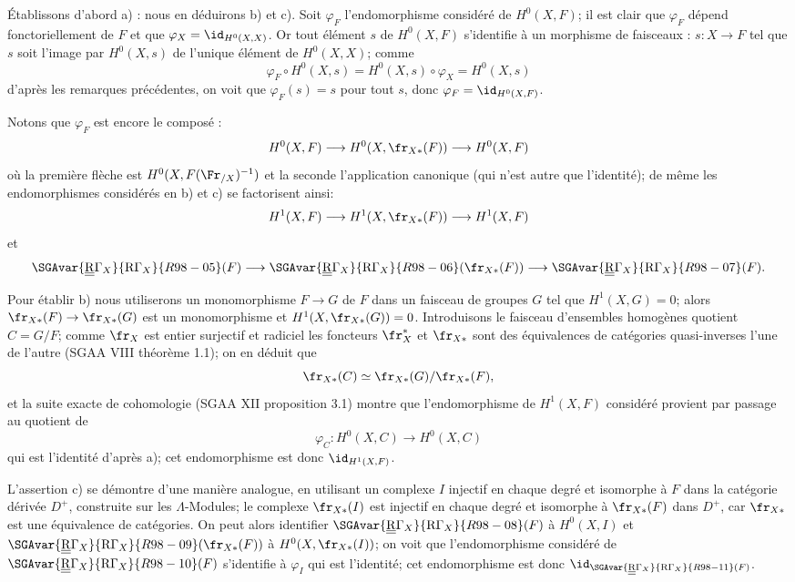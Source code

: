 Établissons d'abord a) : nous en déduirons b) et c). Soit $\varphi_F$ l'endomorphisme considéré de $H^0(X,F)$; il est clair que $\varphi_F$ dépend fonctoriellement de $F$ et que $\varphi_X=\id_{H^0(X,X)}$. Or tout élément $s$ de $H^0(X,F)$ s'identifie à un morphisme de faisceaux : $s:X\to F$ tel que $s$ soit l'image par $H^0(X,s)$ de l'unique élément de $H^0(X,X)$; comme
\[
\varphi_F\circ H^0(X,s)=H^0(X,s)\circ\varphi_X=H^0(X,s)
\]
d'après les remarques précédentes, on voit que $\varphi_F(s)=s$ pour tout $s$, donc $\varphi_F=\id_{H^0(X,F)}$.

Notons que $\varphi_F$ est encore le composé :
\[
H^0(X,F)\longrightarrow H^0(X,\fr_{X*}(F))
\longrightarrow H^0(X,F)
\]
où la première flèche est $H^0(X,F(\Fr_{/X})^{-1})$ et la seconde l'application canonique (qui n'est autre que l'identité); de même les endomorphismes considérés en b) et c) se factorisent ainsi:
\[
H^1(X,F)\longrightarrow H^1(X,\fr_{X*}(F))
\longrightarrow H^1(X,F)
\]
et
\[
\SGAvar{\underline{\underline{\mathrm{R}}}\Gamma_X}{\mathrm{R}\Gamma_X}{R98-05}(F)\longrightarrow \SGAvar{\underline{\underline{\mathrm{R}}}\Gamma_X}{\mathrm{R}\Gamma_X}{R98-06}(\fr_{X*}(F))
\longrightarrow \SGAvar{\underline{\underline{\mathrm{R}}}\Gamma_X}{\mathrm{R}\Gamma_X}{R98-07}(F).
\]

Pour établir b) nous utiliserons un monomorphisme $F\to G$ de $F$ dans un faisceau de groupes $G$ tel que $H^1(X,G)=0$; alors $\fr_{X*}(F)\to\fr_{X*}(G)$ est un monomorphisme et $H^1(X,\fr_{X*}(G))=0$. Introduisons le faisceau d'ensembles homogènes quotient $C=G/F$;
comme $\fr_X$ est entier surjectif et radiciel les foncteurs $\fr_X^*$ et $\fr_{X*}$ sont des équivalences de catégories quasi-inverses l'une de l'autre (SGAA VIII théorème 1.1); on en déduit que
\[
\fr_{X*}(C)\simeq\fr_{X*}(G)/\fr_{X*}(F),
\]
et la suite exacte de cohomologie (SGAA XII proposition 3.1) montre que l'endomorphisme de $H^1(X,F)$ considéré provient par passage au quotient de
\[
\varphi_C:H^0(X,C)\longrightarrow H^0(X,C)
\]
qui est l'identité d'après a); cet endomorphisme est donc $\id_{H^1(X,F)}$.

L'assertion c) se démontre d'une manière analogue, en utilisant un complexe $I$ injectif en chaque degré et isomorphe à $F$ dans la catégorie dérivée $D^+$, construite sur les $\Lambda$-Modules; le complexe $\fr_{X*}(I)$ est injectif en chaque degré et isomorphe à $\fr_{X*}(F)$ dans $D^+$, car $\fr_{X*}$ est une équivalence de catégories. On peut alors identifier $\SGAvar{\underline{\underline{\mathrm{R}}}\Gamma_X}{\mathrm{R}\Gamma_X}{R98-08}(F)$ à $H^0(X,I)$ et $\SGAvar{\underline{\underline{\mathrm{R}}}\Gamma_X}{\mathrm{R}\Gamma_X}{R98-09}(\fr_{X*}(F))$ à $H^0(X,\fr_{X*}(I))$; on voit que l'endomorphisme considéré de $\SGAvar{\underline{\underline{\mathrm{R}}}\Gamma_X}{\mathrm{R}\Gamma_X}{R98-10}(F)$ s'identifie à $\varphi_I$ qui est l'identité; cet endomorphisme est donc $\id_{\SGAvar{\underline{\underline{\mathrm{R}}}\Gamma_X}{\mathrm{R}\Gamma_X}{R98-11}(F)}$.

